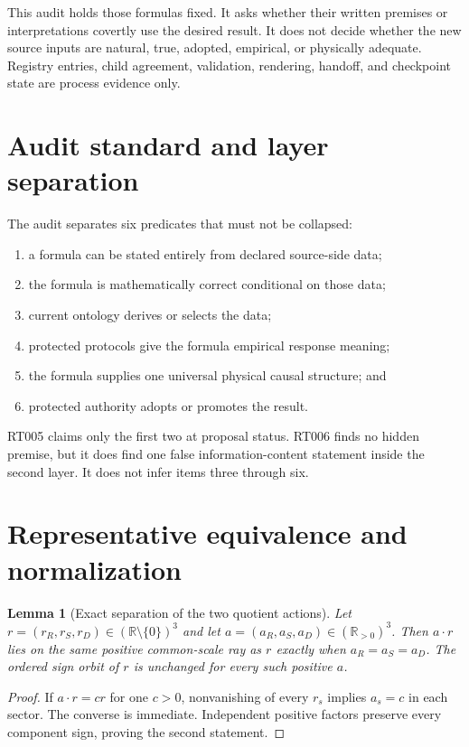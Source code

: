 \documentclass[11pt]{article}
\newtheorem{lemma}{Lemma}
\newcommand{\RR}{\mathbb R}
\begin{document}
This audit holds those formulas fixed.  It asks whether their written premises
or interpretations covertly use the desired result.  It does not decide whether
the new source inputs are natural, true, adopted, empirical, or physically
adequate.  Registry entries, child agreement, validation, rendering, handoff,
and checkpoint state are process evidence only.

\section{Audit standard and layer separation}

The audit separates six predicates that must not be collapsed:

\begin{enumerate}[leftmargin=*]
  \item a formula can be stated entirely from declared source-side data;
  \item the formula is mathematically correct conditional on those data;
  \item current ontology derives or selects the data;
  \item protected protocols give the formula empirical response meaning;
  \item the formula supplies one universal physical causal structure; and
  \item protected authority adopts or promotes the result.
\end{enumerate}

RT005 claims only the first two at proposal status.  RT006 finds no hidden
premise, but it does find one false information-content statement inside the
second layer.  It does not infer items three through six.

\section{Representative equivalence and normalization}

\begin{lemma}[Exact separation of the two quotient actions]
Let $r=(r_R,r_S,r_D)\in(\RR\setminus\{0\})^3$ and let
$a=(a_R,a_S,a_D)\in(\RR_{>0})^3$.  Then $a\mathbin{\cdot}r$ lies on the
same positive common-scale ray as $r$ exactly when
$a_R=a_S=a_D$.  The ordered sign orbit of $r$ is unchanged for every such
positive $a$.
\end{lemma}

\begin{proof}
If $a\mathbin{\cdot}r=cr$ for one $c>0$, nonvanishing of every $r_s$
implies $a_s=c$ in each sector.  The converse is immediate.  Independent
positive factors preserve every component sign, proving the second statement.
\end{proof}
\end{document}

